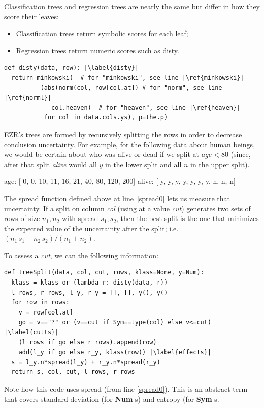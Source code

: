 \documentclass[AMA,STIX2COL]{WileyNJDv5}
\newcommand{\cls}[1]{%
  \setlength{\fboxsep}{1.5pt}%
  \colorbox{clsbg}{\sffamily\bfseries{#1}}%
}
\begin{document}
 Classification trees and regression trees are nearly the same
but differ  in how they score  their leaves:
 \begin{itemize}
 \item Classification trees return symbolic   scores
 for each leaf;
 \item Regression trees return numeric scores such as \textsf{disty}.
 \end{itemize}
\begin{lstlisting}
def disty(data, row): |\label{disty}| 
  return minkowski(  # for "minkowski", see line |\ref{minkowski}|
          (abs(norm(col, row[col.at]) # for "norm", see line |\ref{norml}|
           - col.heaven)  # for "heaven", see line |\ref{heaven}|
           for col in data.cols.ys), p=the.p)
\end{lstlisting}       
EZR's   trees are formed by recursively splitting the rows in order
 to decrease conclusion uncertainty. 
 For example,   for the following data about human beings,
 we would be certain about who was alive or dead if we split
 at   $\mathit{age}<80$
 (since, after that split {\em alive} would all $y$
 in the lower split and all $n$ in the upper split).
 \begin{repl}
 age:   [ 0, 0, 10, 11, 16, 21, 40, 80, 120, 200]
 alive: [ y, y,  y,  y,  y,  y,  y,  n,   n,   n]
\end{repl}
The \textsf{spread} function defined above at line~\ref{spread0} lets us
measure that uncertainty.
If a split on column {\em col} (using at a value {\em cut}) generates two sets of rows of
size $n_1,n_2$ with \textsf{spread} $s_1,s_2$, then the best split is
the one that minimizes the expected value of the uncertainty after
the split; i.e. $(n_1\, s_1 + n_2\, s_2)/(n_1 + n_2)$.

To assess a {\em cut},
we can the following information:
\begin{lstlisting}
def treeSplit(data, col, cut, rows, klass=None, y=Num):
  klass = klass or (lambda r: disty(data, r))
  l_rows, r_rows, l_y, r_y = [], [], y(), y()
  for row in rows:
    v = row[col.at]
    go = v=="?" or (v==cut if Sym==type(col) else v<=cut) |\label{cutts}|
    (l_rows if go else r_rows).append(row)
    add(l_y if go else r_y, klass(row)) |\label{effects}|
  s = l_y.n*spread(l_y) + r_y.n*spread(r_y)
  return s, col, cut, l_rows, r_rows
\end{lstlisting}
Note how this code  uses  \textsf{spread} (from line \ref{spread0}). This is an abstract term
that covers standard deviation (for \cls{Num}s) and entropy (for \cls{Sym}s.
\end{document}
